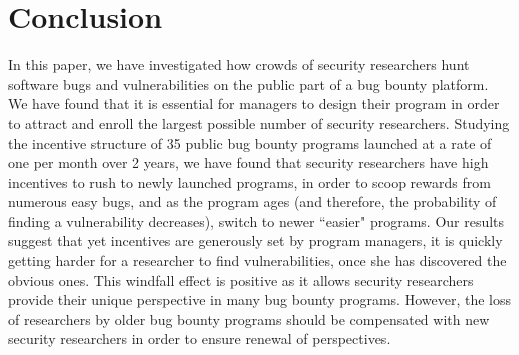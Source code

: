 \section{Conclusion}
\label{sec:conclusion}
In this paper, we have investigated how crowds of security researchers hunt software bugs and vulnerabilities on the public part of a bug bounty platform. We have found that it is essential for managers to design their program in order to attract and enroll the largest possible number of security researchers. Studying the incentive structure of 35 public bug bounty programs launched at a rate of one per month over 2 years, we have found that security researchers have high incentives to rush to newly launched programs, in order to scoop rewards from numerous easy bugs, and as the program ages (and therefore, the probability of finding a vulnerability decreases), switch to newer ``easier" programs. Our results suggest that yet incentives are generously set by program managers, it is quickly getting harder for a researcher to find vulnerabilities, once she has discovered the obvious ones. This windfall effect is positive as it allows security researchers provide their unique perspective in many bug bounty programs. However, the loss of researchers by older bug bounty programs should be compensated with new security researchers in order to ensure renewal of perspectives. 